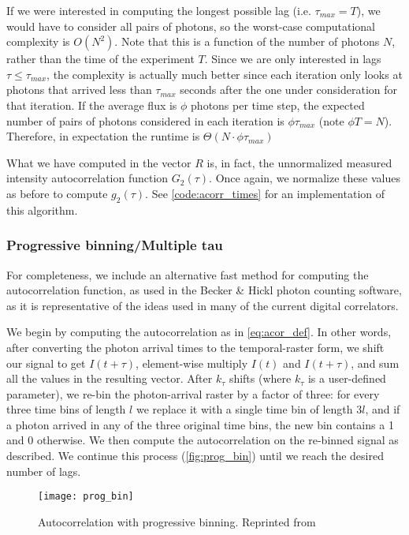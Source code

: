 If we were interested in computing the longest possible lag (i.e. $\tau_{max} = T$), we would have to consider all pairs of photons, so the worst-case computational complexity is $O(N^2)$. Note that this is a function of the number of photons $N$, rather than the time of the experiment $T$. Since we are only interested in lags $\tau \leq \tau_{max}$, the complexity is actually much better since each iteration only looks at photons that arrived less than $\tau_{max}$ seconds after the one under consideration for that iteration. If the average flux is $\phi$ photons per time step, the expected number of pairs of photons considered in each iteration is $\phi\tau_{max}$ (note $\phi T=N$). Therefore, in expectation the runtime is $\Theta(N\cdot\phi\tau_{max})$

What we have computed in the vector $R$ is, in fact, the unnormalized measured intensity autocorrelation function $G_2(\tau)$. Once again, we normalize these values as before to compute $g_2(\tau)$. See \autoref{code:acorr_times} for an implementation of this algorithm. 

\subsubsection{Progressive binning/Multiple tau} 
For completeness, we include an alternative fast method for computing the autocorrelation function, as used in the Becker \& Hickl photon counting software, \cite{Becker2014} as it is representative of the ideas used in many of the current digital correlators. 

We begin by computing the autocorrelation as in \ref{eq:acor_def}. In other words,  after converting the photon arrival times to the temporal-raster form, we shift our signal to get $I(t+\tau)$, element-wise multiply $I(t)$ and $I(t+\tau)$, and sum all the values in the resulting vector. After $k_\tau$ shifts (where $k_\tau$ is a user-defined parameter), we re-bin the photon-arrival raster by a factor of three: for every three time bins of length $l$ we replace it with a single time bin of length $3l$, and if a photon arrived in any of the three original time bins, the new bin contains a 1 and 0 otherwise.  We then compute the autocorrelation on the re-binned signal as described. We continue this process (\autoref{fig:prog_bin}) until we reach the desired number of lags. 

\begin{figure}[tb]
    \centering
    \texttt{[image: prog\_bin]}
    \caption{Autocorrelation with progressive binning. Reprinted from \cite[p.~461]{Becker2014}}
    \label{fig:prog_bin}
\end{figure}

